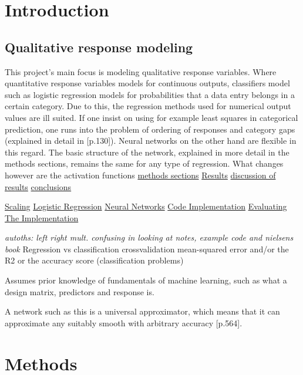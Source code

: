 \documentclass[%
oneside,                 %
final,                   %
10pt]{article}
\begin{document}
\section{Introduction}
\subsection{Qualitative response modeling}
This project's main focus is modeling qualitative response variables. Where quantitative response variables models for continuous outputs, classifiers model such as logistic regression models for probabilities that a data entry belongs in a certain category. Due to this, the regression methods used for numerical output values are ill suited. If one insist on using for example least squares in categorical prediction, one runs into the problem of ordering of responses and category gaps (explained in detail in  \citep{2017introstatlearn}[p.130]). Neural networks on the other hand are flexible in this regard. The basic structure of the network, explained in more detail in the methods sections, remains the same for any type of regression. What changes however are the activation functions
\hyperref[Section_Methods]{methods sections}
\hyperref[Section_Results]{Results}
\hyperref[Section_Discussion_of_results]{discussion of results}
\hyperref[Section_Conclusions]{conclusions}

\hyperref[Section_M_Scaling]{Scaling}
\hyperref[Section_M_Logreg]{Logistic Regression}
\hyperref[Section_M_NN]{Neural Networks}
\hyperref[Section_M_Codeimpl]{Code Implementation}
\hyperref[Section_M_eval]{Evaluating The Implementation}

\textit{autoths: left right mult. confusing in looking at notes, example code and nielsens book}
Regression vs classification
crossvalidation
mean-squared error and/or the R2
or the accuracy score (classification problems) 

Assumes prior knowledge of fundamentals of machine learning, such as what a design matrix, predictors and response is.

A network such as this is a universal approximator, which means that it can approximate any suitably smooth with arbitrary accuracy \citep{MLMurphy}[p.564].
\section{Methods} \label{Section_Theory}
\end{document}
